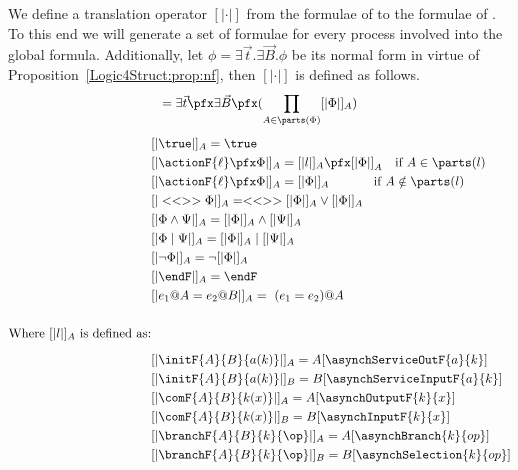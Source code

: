 \begin{definition} \label{Logic4Struct:def::logicalprojection}

We define a translation operator $[| \cdot |]$ from the formulae of \GL to
the formulae of \LL. To this end we will generate a set of formulae for every
process involved into the global formula. Additionally, let 
$\phi =  \exists \vec{t}. \exists
\vec{B}. \phi$
 be its normal form in virtue of
Proposition~\ref{Logic4Struct:prop:nf}, then $[| \cdot |]$ is defined as follows.
\begin{gather*}
  [| \exists \vec{t}\pfx \exists \vec{B}\pfx \Phi|] =
   \exists \vec{t}\pfx \exists \vec{B}\pfx
  (\prod_{A \in \parts(\Phi)} [|\Phi|]_A) \\[1ex]
   \begin{align*}
&     [|\true|]_A  = \true \\
&     [|\actionF{\ell} \pfx \Phi|]_A  =     [|l|]_A \pfx [|\Phi|]_A \quad \text{if } A \in \parts(l) \\
&     [| \actionF{\ell} \pfx \Phi|]_A  =     [|\Phi|]_A \qquad\quad\ \, \text{if } A \notin \parts(l) \\
&     [|<<>>\Phi|]_A  = <<>> [|\Phi|]_A \vee [|\Phi|]_A\\
&     [|\Phi \wedge \Psi|]_A  =[|\Phi|]_A \wedge [|\Psi|]_A \\
&     [|\Phi \mid \Psi|]_A  = [|\Phi|]_A \mid [|\Psi|]_A \\
&     [|\neg \Phi|]_A  = \neg [|\Phi|]_A \\
&     [|\endF|]_A  = \endF      \\
&     [| e_1@A = e_2@B |]_A  = \ (e_1 = e_2)@A\\\\
     \text{Where } [|l|]_A \text{ is defined as:}\\[0.2cm]
&     [| \initF{A}{B}{a(k)} |]_A  = A[ \asynchServiceOutF{a}{k} ] \\
&     [| \initF{A}{B}{a(k)} |]_B  = B[ \asynchServiceInputF{a}{k} ] \\     
&     [| \comF{A}{B}{k(x)} |]_A  = A[ \asynchOutputF{k}{x}]      \\
&     [|\comF{A}{B}{k(x)} |]_B  = B[ \asynchInputF{k}{x}] \\ 
&     [| \branchF{A}{B}{k}{\op} |]_A  = A[ \asynchBranch{k}{op} ]          \\
&     [| \branchF{A}{B}{k}{\op} |]_B  = B[ \asynchSelection{k}{op} ]
   \end{align*}
 \end{gather*}

\end{definition}

